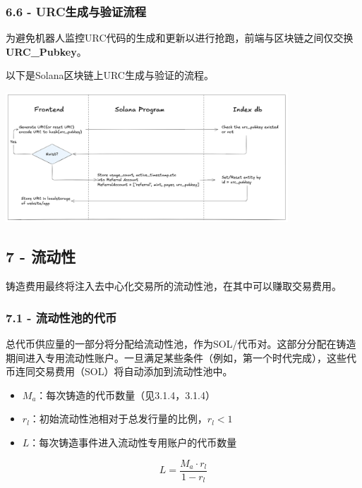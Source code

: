 \documentclass[
]{article}
\providecommand{\tightlist}{%
  \setlength{\itemsep}{0pt}\setlength{\parskip}{0pt}}
\begin{document}
\subsubsection{6.6 -
URC生成与验证流程}\label{urcux751fux6210ux4e0eux9a8cux8bc1ux6d41ux7a0b}

为避免机器人监控URC代码的生成和更新以进行抢跑，前端与区块链之间仅交换\textbf{URC\_Pubkey}。

以下是Solana区块链上URC生成与验证的流程。

\includegraphics[width=400px]{urc_workflow}

\subsection{7 - 流动性}\label{ux6d41ux52a8ux6027}

铸造费用最终将注入去中心化交易所的流动性池，在其中可以赚取交易费用。

\subsubsection{7.1 -
流动性池的代币}\label{ux6d41ux52a8ux6027ux6c60ux7684ux4ee3ux5e01}

总代币供应量的一部分将分配给流动性池，作为SOL/代币对。这部分分配在铸造期间进入专用流动性账户。一旦满足某些条件（例如，第一个时代完成），这些代币连同交易费用（SOL）将自动添加到流动性池中。

\begin{itemize}
\tightlist
\item
  \(M_a\)：每次铸造的代币数量（见3.1.4，3.1.4）
\item
  \(r_l\)：初始流动性池相对于总发行量的比例，\(r_l < 1\)
\item
  \(L\)：每次铸造事件进入流动性专用账户的代币数量
\end{itemize}

\begin{equation}
L = \frac{M_a \cdot r_l}{1 - r_l}
\end{equation}
\end{document}
